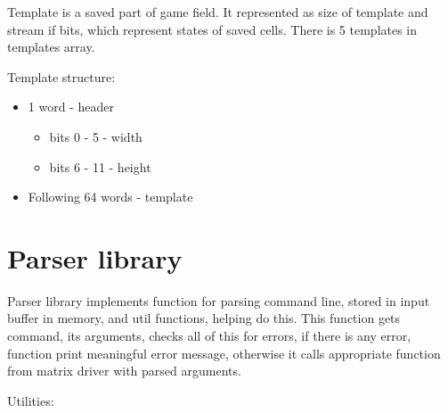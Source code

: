 Template is a saved part of game field. It represented as size of template and stream if bits, which represent states of saved cells. There is 5 templates in templates array.

Template structure:

\begin{itemize}
	\item 1 word - header
		\begin{itemize}
			\item bits 0 - 5 - width
			\item bits 6 - 11 - height
		\end{itemize}
	\item Following 64 words - template
\end{itemize}

\section*{Parser library}

Parser library implements function for parsing command line, stored in input buffer in memory, and util functions, helping do this. This function gets command, its arguments, checks all of this for errors, if there is any error, function print meaningful error message, otherwise it calls appropriate function from matrix driver with parsed arguments.

Utilities:

